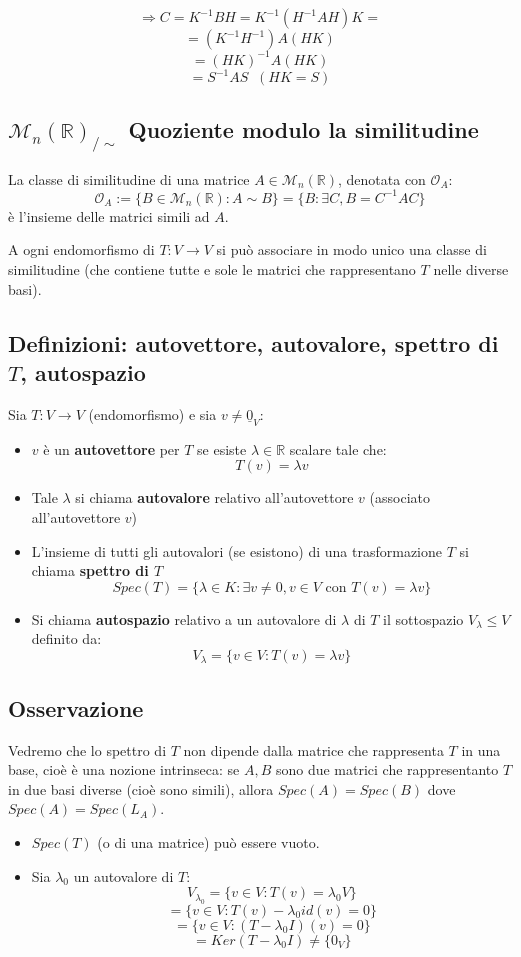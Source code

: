 \[\Rightarrow C=K^{-1}BH=K^{-1}(H^{-1}AH)K=\]
\[=(K^{-1}H^{-1})A(HK)\]
\[=(HK)^{-1}A(HK)\]
\[=S^{-1}AS\;\;(HK=S)\]

\subsection{$\mathcal{M}_n(\mathbb{R})_{/\sim}$ Quoziente modulo la similitudine}
La classe di similitudine di una matrice $A\in \mathcal{M}_n(\mathbb{R})$, denotata con $\mathcal{O}_A$:
\[\mathcal{O}_A:=\{B\in\mathcal{M}_n(\mathbb{R}): A\sim B\}=\{B:\exists C, B=C^{-1}AC\}\]
è l'insieme delle matrici simili ad $A$.

A ogni endomorfismo di $T:V\rightarrow V$ si può associare in modo unico una classe di similitudine (che contiene tutte e sole le matrici che rappresentano $T$ nelle diverse basi).

\subsection{Definizioni: autovettore, autovalore, spettro di $T$, autospazio}
Sia $T:V\rightarrow V$ (endomorfismo) e sia $v\neq\underline{0}_V$:
\begin{itemize}
\item $v$ è un \textbf{autovettore} per $T$ se esiste $\lambda\in\mathbb{R}$ scalare tale che:
  \[T(v)=\lambda v\]
\item Tale $\lambda$ si chiama \textbf{autovalore} relativo all'autovettore $v$ (associato all'autovettore $v$)
\item L'insieme di tutti gli autovalori (se esistono) di una trasformazione $T$ si chiama \textbf{spettro di $T$}
  \[Spec(T)=\{\lambda\in K:\exists v\neq 0, v\in V\text{ con } T(v)=\lambda v\}\]

\item Si chiama \textbf{autospazio} relativo a un autovalore di $\lambda$ di $T$ il sottospazio $V_\lambda \leq V$ definito da:
  \[V_\lambda=\{v\in V:T(v)=\lambda v\}\]

\end{itemize}

\subsection{Osservazione}
Vedremo che lo spettro di $T$ non dipende dalla matrice che rappresenta $T$ in una base, cioè è una nozione intrinseca: se $A,B$ sono due matrici che rappresentanto $T$ in due basi diverse (cioè sono simili), allora $Spec(A)=Spec(B)$ dove $Spec(A)=Spec(L_A)$.
\begin{itemize}
\item $Spec(T)$ (o di una matrice) può essere vuoto.
\item Sia $\lambda_0$ un autovalore di $T$:
  \[V_{\lambda_0}=\{v\in V: T(v)=\lambda_0 V\}\]
  \[=\{v\in V: T(v)-\lambda_0id(v)=0\}\]
  \[=\{v\in V:(T-\lambda_0I)(v)=0\}\]
  \[=Ker(T-\lambda_0I)\neq\{0_V\}\]
\end{itemize}

